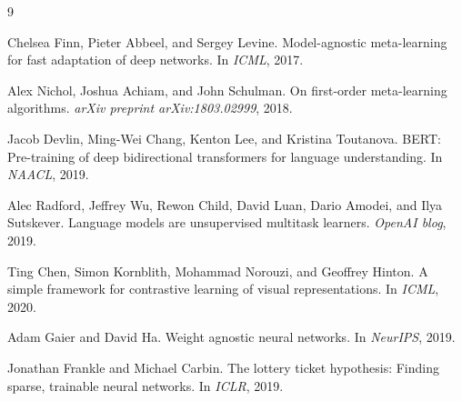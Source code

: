 \documentclass[11pt,twocolumn]{article}
\begin{document}

\begin{thebibliography}{9}

Chelsea Finn, Pieter Abbeel, and Sergey Levine.
\newblock Model-agnostic meta-learning for fast adaptation of deep networks.
\newblock In \emph{ICML}, 2017.

Alex Nichol, Joshua Achiam, and John Schulman.
\newblock On first-order meta-learning algorithms.
\newblock \emph{arXiv preprint arXiv:1803.02999}, 2018.

Jacob Devlin, Ming-Wei Chang, Kenton Lee, and Kristina Toutanova.
\newblock BERT: Pre-training of deep bidirectional transformers for language understanding.
\newblock In \emph{NAACL}, 2019.

Alec Radford, Jeffrey Wu, Rewon Child, David Luan, Dario Amodei, and Ilya Sutskever.
\newblock Language models are unsupervised multitask learners.
\newblock \emph{OpenAI blog}, 2019.

Ting Chen, Simon Kornblith, Mohammad Norouzi, and Geoffrey Hinton.
\newblock A simple framework for contrastive learning of visual representations.
\newblock In \emph{ICML}, 2020.

Adam Gaier and David Ha.
\newblock Weight agnostic neural networks.
\newblock In \emph{NeurIPS}, 2019.

Jonathan Frankle and Michael Carbin.
\newblock The lottery ticket hypothesis: Finding sparse, trainable neural networks.
\newblock In \emph{ICLR}, 2019.

\end{thebibliography}
\end{document}
